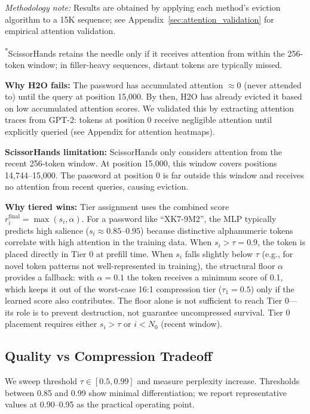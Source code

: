 \documentclass[11pt]{article}
\begin{document}
\textit{Methodology note:} Results are obtained by applying each method's eviction algorithm to a 15K sequence; see Appendix~\ref{sec:attention_validation} for empirical attention validation.

\textsuperscript{*}ScissorHands retains the needle only if it receives attention from within the 256-token window; in filler-heavy sequences, distant tokens are typically missed.

\textbf{Why H2O fails:} The password has accumulated attention $\approx 0$ (never attended to) until the query at position 15,000. By then, H2O has already evicted it based on low accumulated attention scores. We validated this by extracting attention traces from GPT-2: tokens at position 0 receive negligible attention until explicitly queried (see Appendix for attention heatmaps).

\textbf{ScissorHands limitation:} ScissorHands only considers attention from the recent 256-token window. At position 15,000, this window covers positions 14,744--15,000. The password at position 0 is far outside this window and receives no attention from recent queries, causing eviction.

\textbf{Why tiered wins:} Tier assignment uses the combined score
$r_i^{\text{final}} = \max(s_i, \alpha)$. For a password like ``XK7-9M2'', the
MLP typically predicts high salience ($s_i \approx 0.85$--$0.95$) because
distinctive alphanumeric tokens correlate with high attention in the training
data. When $s_i > \tau = 0.9$, the token is placed directly in Tier 0 at prefill
time. When $s_i$ falls slightly below $\tau$ (e.g., for novel token patterns not
well-represented in training), the structural floor $\alpha$ provides a fallback:
with $\alpha=0.1$ the token receives a minimum score of 0.1, which keeps it out
of the worst-case 16:1 compression tier ($\tau_1=0.5$) only if the learned score
also contributes. The floor alone is not sufficient to reach Tier 0---its role is
to prevent destruction, not guarantee uncompressed survival. Tier 0 placement
requires either $s_i > \tau$ or $i < N_0$ (recent window).

\subsection{Quality vs Compression Tradeoff}

We sweep threshold $\tau \in [0.5, 0.99]$ and measure perplexity increase. Thresholds between 0.85 and 0.99 show minimal differentiation; we report representative values at 0.90--0.95 as the practical operating point.
\end{document}
